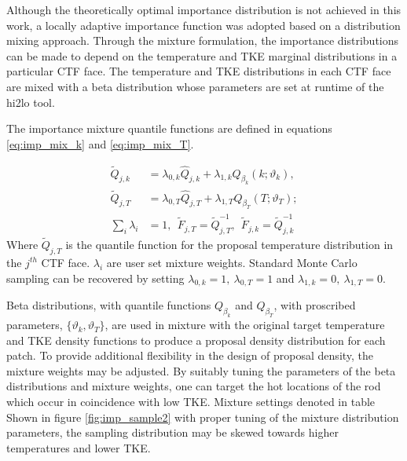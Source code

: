 Although the theoretically optimal importance distribution is not achieved in this work, a locally adaptive importance function was adopted based on a distribution mixing approach.  Through the mixture formulation, the importance distributions can be made to depend on the temperature and TKE marginal distributions in a particular CTF face.  The temperature and TKE distributions in each CTF face are mixed with a beta distribution whose parameters are set at runtime of the hi2lo tool.  

The importance  mixture quantile functions are defined in equations \ref{eq:imp_mix_k} and \ref{eq:imp_mix_T}.

\begin{align}
\tilde Q_{j,k} &= \lambda_{0,k} \hat Q_{j,k}  + \lambda_{1,k} Q_{\beta_k}(k; \vartheta_k),  \label{eq:imp_mix_k} \\
\tilde Q_{j,T} &= \lambda_{0,T} \hat Q_{j,T}  + \lambda_{1,T} Q_{\beta_T}(T; \vartheta_T);  \label{eq:imp_mix_T} \\
\sum_i \lambda_i &= 1, \ \ \tilde F_{j,T} = \tilde Q^{-1}_{j,T},\ \  \tilde F_{j,k} = \tilde Q^{-1}_{j,k}
\label{eq:imp_mix_dists}
\end{align}
Where $\tilde Q_{j,T}$ is the quantile function for the proposal temperature distribution in the $j^{th}$ CTF face. $\lambda_i$ are user set mixture weights. Standard Monte Carlo sampling can be recovered by setting $\lambda_{0,k}=1,\ \lambda_{0,T}=1$ and  $\lambda_{1,k}=0,\ \lambda_{1,T}=0$.

Beta distributions, with quantile functions $Q_{\beta_k}$ and $Q_{\beta_T}$,  with proscribed parameters, $\{ \vartheta_k, \vartheta_T \}$, are used in mixture with the original target temperature and TKE density functions to produce a proposal density distribution for each patch.  To provide additional flexibility in the design of proposal density, the mixture weights may be adjusted. By suitably tuning the parameters of the beta distributions and mixture weights, one can target the hot locations of the rod which occur in coincidence with low TKE.  Mixture settings denoted in table %
Shown in figure \ref{fig:imp_sample2} with proper tuning of the mixture distribution parameters, the sampling distribution may be skewed towards higher temperatures and lower TKE.

